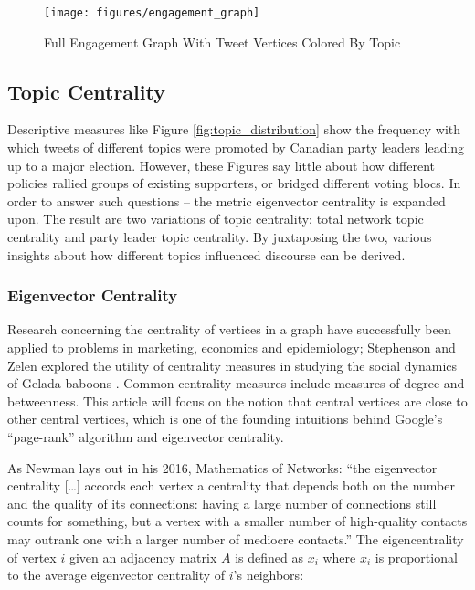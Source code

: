 \begin{figure}[h!]
  \centering
  \texttt{[image: figures/engagement\_graph]}
  \caption[Full Engagement Graph]{Full Engagement Graph With Tweet Vertices Colored By Topic}
  \label{fig:engagement_graph}
\end{figure}

\subsection{Topic Centrality}

Descriptive measures like Figure \ref{fig:topic_distribution} show the frequency
with which tweets of different topics were promoted by Canadian party leaders
leading up to a major election. However, these Figures say little about how
different policies rallied groups of existing supporters, or bridged different
voting blocs. In order to answer such questions – the metric eigenvector
centrality is expanded upon. The result are two variations of topic centrality:
total network topic centrality and party leader topic centrality. By juxtaposing
the two, various insights about how different topics influenced discourse can be
derived.

\subsubsection{Eigenvector Centrality}

Research concerning the centrality of vertices in a graph have successfully been
applied to problems in marketing, economics and epidemiology; Stephenson and
Zelen explored the utility of centrality measures in studying the social
dynamics of Gelada baboons \cite{stephenson1989rethinking}. Common centrality
measures include measures of degree and betweenness. This article will focus on
the notion that central vertices are close to other central vertices, which is
one of the founding intuitions behind Google’s “page-rank” algorithm and
eigenvector centrality.

As Newman lays out in his 2016, Mathematics of Networks: ``the eigenvector
centrality [\dots] accords each vertex a centrality that depends both on the
number and the quality of its connections: having a large number of connections
still counts for something, but a vertex with a smaller number of high-quality
contacts may outrank one with a larger number of mediocre contacts.''
\cite{newman2008mathematics} The eigencentrality of vertex $i$ given an
adjacency matrix $A$ is defined as $x_i$ where $x_i$ is proportional to the
average eigenvector centrality of $i$’s neighbors:

